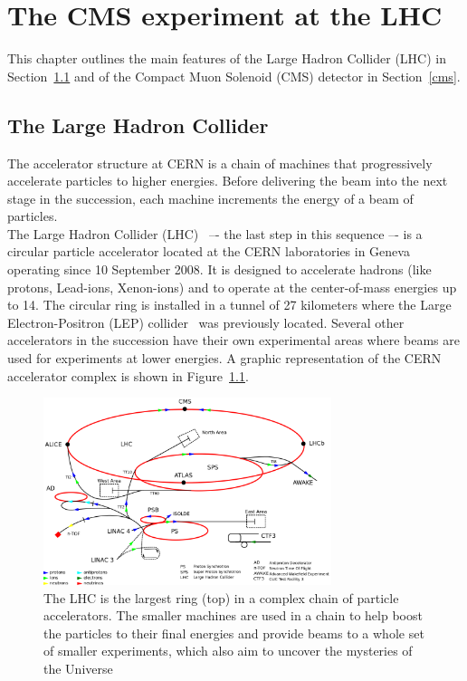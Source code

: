 \chapter{The CMS experiment at the LHC} \label{Chapter2} 



This chapter outlines the main features of the Large
Hadron Collider (LHC) in Section~\ref{lhc} and of the Compact Muon Solenoid (CMS)
detector in Section~\ref{cms}. 



\section{The Large Hadron Collider}\label{lhc}
The accelerator structure at CERN is a chain of machines that
progressively accelerate particles to higher energies. Before delivering the beam into the next stage in the succession, each machine
increments the energy of a beam of particles.\\
The Large Hadron Collider (LHC)~\cite{Brning2004LHCDR} –- the last step in this sequence –- is a circular particle accelerator
located at the CERN laboratories in Geneva operating since 10
September 2008. It is
designed to accelerate hadrons (like protons, Lead-ions, Xenon-ions) and to
operate at the center-of-mass energies up to 14\TeV.
The circular ring is installed in a tunnel of 27 kilometers where
the Large Electron-Positron (LEP) collider~\cite{Lep:designReport} was
previously located. Several other accelerators in the succession have
their own experimental areas where beams are used for experiments at lower energies.
A graphic representation of the CERN accelerator
complex is shown in Figure~\ref{fig:cern}. 

\begin{figure}[h]
\centering
\includegraphics[width=0.75\textwidth]{Figures/c2/Cern-accelerator-complex.png}
\vspace*{3mm}
\caption{The LHC is the largest ring (top) in a complex chain of particle accelerators. The smaller machines are used in a chain to help boost the particles to their final energies and provide beams to a whole set of smaller experiments, which also aim to uncover the mysteries of the Universe~\cite{Mobs:2197559}}
\label{fig:cern}
\end{figure}

